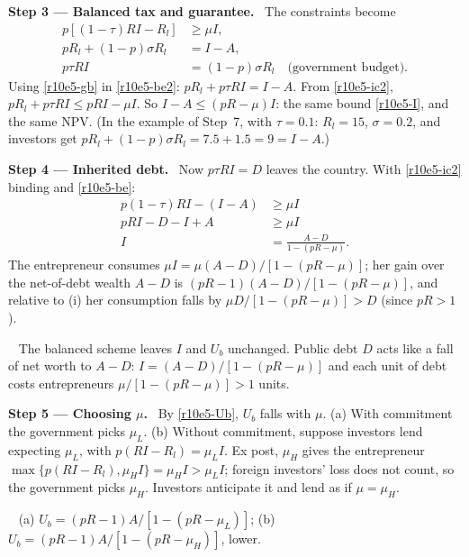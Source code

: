 \documentclass[11pt,a4paper]{article}
\newcommand{\step}[2]{\par\medskip\noindent\textbf{Step #1 --- #2.}~}
\newcommand{\answer}[1]{\par\smallskip\noindent\fbox{\textbf{Answer\if\relax\detokenize{#1}\relax\else\ #1\fi.}}~}
\begin{document}
\step{3}{Balanced tax and guarantee} The constraints become
\begin{align}
  p[(1-\tau)RI-R_l] &\geq \mu I, \label{r10e5-ic2}\\
  pR_l+(1-p)\sigma R_l &= I-A, \label{r10e5-be2}\\
  p\tau RI &= (1-p)\sigma R_l \quad\text{(government budget)}. \label{r10e5-gb}
\end{align}
Using \eqref{r10e5-gb} in \eqref{r10e5-be2}: $pR_l+p\tau RI=I-A$. From \eqref{r10e5-ic2}, $pR_l+p\tau RI\leq pRI-\mu I$. So $I-A\leq(pR-\mu)I$: the same bound \eqref{r10e5-I}, and the same NPV. (In the example of Step~7, with $\tau=0.1$: $R_l=15$, $\sigma=0.2$, and investors get $pR_l+(1-p)\sigma R_l=7.5+1.5=9=I-A$.)

\step{4}{Inherited debt} Now $p\tau RI=D$ leaves the country. With \eqref{r10e5-ic2} binding and \eqref{r10e5-be}:
\begin{align}
  p(1-\tau)RI-(I-A) &\geq \mu I \nonumber\\
  pRI-D-I+A &\geq \mu I \nonumber\\
  I &= \frac{A-D}{1-(pR-\mu)}. \label{r10e5-ID}
\end{align}
The entrepreneur consumes $\mu I=\mu(A-D)/[1-(pR-\mu)]$; her gain over the net-of-debt wealth $A-D$ is $(pR-1)(A-D)/[1-(pR-\mu)]$, and relative to (i) her consumption falls by $\mu D/[1-(pR-\mu)]>D$ (since $pR>1$).

\answer{(ii)} The balanced scheme leaves $I$ and $U_b$ unchanged. Public debt $D$ acts like a fall of net worth to $A-D$: $I=(A-D)/[1-(pR-\mu)]$ and each unit of debt costs entrepreneurs $\mu/[1-(pR-\mu)]>1$ units.

\step{5}{Choosing $\mu$} By \eqref{r10e5-Ub}, $U_b$ falls with $\mu$. (a) With commitment the government picks $\mu_L$. (b) Without commitment, suppose investors lend expecting $\mu_L$, with $p(RI-R_l)=\mu_LI$. Ex post, $\mu_H$ gives the entrepreneur $\max\{p(RI-R_l),\mu_HI\}=\mu_HI>\mu_LI$; foreign investors' loss does not count, so the government picks $\mu_H$. Investors anticipate it and lend as if $\mu=\mu_H$.

\answer{(iii)} (a) $U_b=(pR-1)A/[1-(pR-\mu_L)]$; (b) $U_b=(pR-1)A/[1-(pR-\mu_H)]$, lower.
\end{document}
